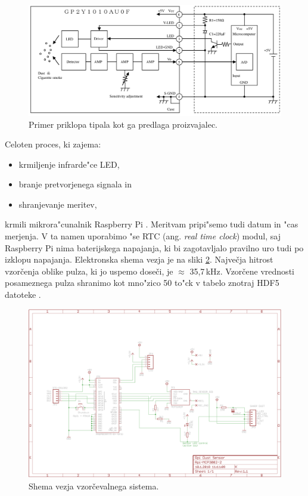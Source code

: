 \documentclass[12pt,a4paper]{article}
\begin{document}
\begin{figure}[H]
	\begin{center}
		\includegraphics[width=12cm]{integration-scheme.png}
		\caption{Primer priklopa tipala kot ga predlaga proizvajalec.}
		\label{integration-scheme}
	\end{center}
\end{figure}

Celoten proces, ki zajema:
\begin{itemize}
	\item krmiljenje infrarde"ce LED,
	\item branje pretvorjenega signala in
	\item shranjevanje meritev,
\end{itemize}

krmili mikrora"cunalnik Raspberry Pi \cite{rbpi-wiki}. Meritvam pripi"semo tudi datum in "cas merjenja. V ta namen uporabimo "se RTC (ang. \textit{real time clock}) modul, saj Raspberry Pi nima baterijskega napajanja, ki bi zagotavljalo pravilno uro tudi po izklopu napajanja. Elektronska shema vezja je na sliki \ref{sl:shema-vezja}.
Največja hitrost vzorčenja oblike pulza, ki jo uspemo doseči, je $ \approx $ 35,7\,kHz. Vzorčene vrednosti posameznega pulza shranimo kot mno"zico 50 to"ck v tabelo znotraj HDF5 datoteke \cite{hdf5}.


\begin{figure}[H]
	\begin{center}
		\includegraphics[width=12cm]{scheme.png}
		\caption{Shema vezja vzorčevalnega sistema.}
		\label{sl:shema-vezja}
	\end{center}
\end{figure}
\end{document}
